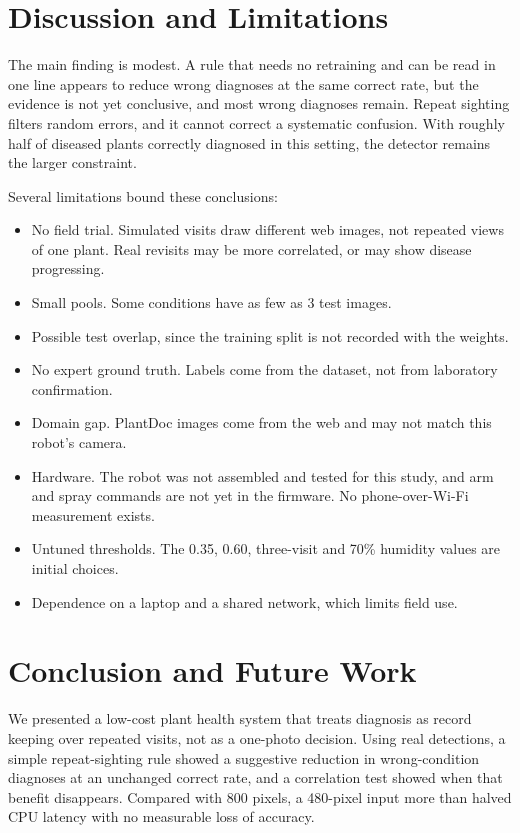 \documentclass[conference]{IEEEtran}
\begin{document}
\section{Discussion and Limitations}
The main finding is modest. A rule that needs no retraining and can be read in one line appears to reduce wrong diagnoses at the same correct rate, but the evidence is not yet conclusive, and most wrong diagnoses remain. Repeat sighting filters random errors, and it cannot correct a systematic confusion. With roughly half of diseased plants correctly diagnosed in this setting, the detector remains the larger constraint.

Several limitations bound these conclusions:

\begin{itemize}
\item No field trial. Simulated visits draw different web images, not repeated views of one plant. Real revisits may be more correlated, or may show disease progressing.
\item Small pools. Some conditions have as few as 3 test images.
\item Possible test overlap, since the training split is not recorded with the weights.
\item No expert ground truth. Labels come from the dataset, not from laboratory confirmation.
\item Domain gap. PlantDoc images come from the web and may not match this robot's camera.
\item Hardware. The robot was not assembled and tested for this study, and arm and spray commands are not yet in the firmware. No phone-over-Wi-Fi measurement exists.
\item Untuned thresholds. The 0.35, 0.60, three-visit and 70\% humidity values are initial choices.
\item Dependence on a laptop and a shared network, which limits field use.
\end{itemize}
\section{Conclusion and Future Work}
We presented a low-cost plant health system that treats diagnosis as record keeping over repeated visits, not as a one-photo decision. Using real detections, a simple repeat-sighting rule showed a suggestive reduction in wrong-condition diagnoses at an unchanged correct rate, and a correlation test showed when that benefit disappears. Compared with 800 pixels, a 480-pixel input more than halved CPU latency with no measurable loss of accuracy.
\end{document}
